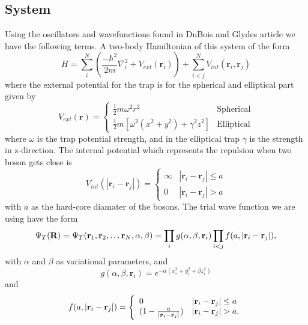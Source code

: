 \documentclass[12pt]{article}
\begin{document}
  \subsection{System}
  Using the oscillators and wavefunctions found in DuBois and Glydes \cite{BEcond}
  article we have the following terms.
  A two-body Hamiltonian of this system of the form
  \begin{equation}
     H = \sum_i^N \left(\frac{-\hbar^2}{2m}\nabla^2_i + V_{ext}(\bm{r}_i)\right) + %
     \sum_{i< j}^N V_{int}(\bm{r}_i,\bm{r}_j)
  \end{equation}
  where the external potential for the trap is for the spherical and elliptical part
  given by
  \begin{equation}
    V_{ext}(\bm{r}) = \left\{%
      \begin{array}{lr}
	\frac{1}{2}m\omega^2r^2 & \text{Spherical}\\
	\frac{1}{2}m[\omega^2(x^2 + y^2) + \gamma^2z^2] & \text{Elliptical}
      \end{array}
      \right.
  \end{equation}
  where $\omega$ is the trap potential strength, and in the elliptical trap $\gamma$ is
  the strength in z-direction.
  The internal potential which represents the repulsion when two boson gets close is
  \begin{equation}
    V_{int}(|\bm{r}_i - \bm{r}_j|) = \left\{%
    \begin{array}{lr}
      \infty & |\bm{r}_i - \bm{r}_j| \leq a\\
      0 & |\bm{r}_i - \bm{r}_j| > a
    \end{array}
    \right.
  \end{equation}
  with $a$ as the hard-core diamater of the bosons.
  The trial wave function we are using have the form
  \begin{equation}
    \Psi_T({\bf R})=\Psi_T({\bf r}_1, {\bf r}_2, \dots {\bf r}_N,\alpha,\beta)=\prod_i%
    g(\alpha,\beta,{\bf r}_i)\prod_{i<j}f(a,|{\bf r}_i-{\bf r}_j|),
    \label{eq:psit}
  \end{equation}
  with $\alpha$ and $\beta$ as variational parameters, and 
  \[ g(\alpha, \beta, \bm{r}_i) = e^{-\alpha(x_i^2 + y_i^2 + \beta z_i^2)} \]
  and
  \begin{equation}
    f(a,|{\bf r}_i-{\bf r}_j|)=\Bigg\{
    \begin{array}{ll}
      0 & {|{\bf r}_i-{\bf r}_j|} \leq {a}\\
	(1-\frac{a}{|{\bf r}_i-{\bf r}_j|}) & {|{\bf r}_i-{\bf r}_j|} > {a}.
    \end{array}
  \end{equation}  
\end{document}
